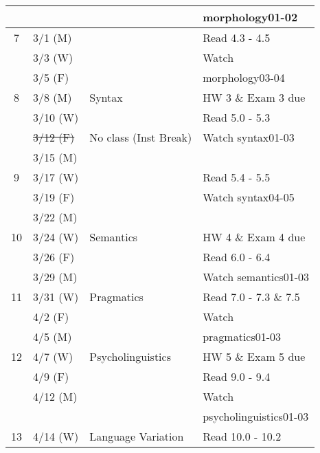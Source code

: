 \documentclass{article}
\begin{document}
\begin{longtable}{c l l | l}
            &             &                                 & morphology01-02\\
      \hline
      7     & 3/1  (M)    &                                 & Read 4.3 - 4.5\\
            & 3/3  (W)    &                                 & Watch\\
            & 3/5  (F)    &                                 & morphology03-04\\
      \hline
      8     & 3/8  (M)    & Syntax                          & HW 3 \& Exam 3 due\\
            & 3/10 (W)    &                                 & Read 5.0 - 5.3\\
            & \sout{3/12 (F)} & No class (Inst Break)       & Watch syntax01-03\\
            & 3/15 (M)    &                                 & \\
      \hline
      9     & 3/17 (W)    &                                 & Read 5.4 - 5.5\\
            & 3/19 (F)    &                                 & Watch syntax04-05\\
            & 3/22 (M)    &                                 & \\
      \hline
      10    & 3/24 (W)    & Semantics                       & HW 4 \& Exam 4 due\\
            & 3/26 (F)    &                                 & Read 6.0 - 6.4\\
            & 3/29 (M)    &                                 & Watch semantics01-03\\
      \hline
      11    & 3/31 (W)    & Pragmatics                      & Read 7.0 - 7.3 \& 7.5\\
            & 4/2  (F)    &                                 & Watch\\
            & 4/5  (M)    &                                 & pragmatics01-03\\
      \hline
      12    & 4/7  (W)    & Psycholinguistics               & HW 5 \& Exam 5 due\\
            & 4/9  (F)    &                                 & Read 9.0 - 9.4\\
            & 4/12 (M)    &                                 & Watch\\
            &             &                                 & psycholinguistics01-03\\
      \hline
      13    & 4/14 (W)    & Language Variation              & Read 10.0 - 10.2\\

\end{longtable}
\end{document}
